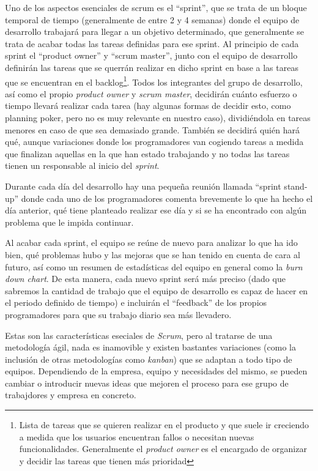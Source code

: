 Uno de los aspectos esenciales de scrum es el ``sprint'', que se trata de un bloque temporal de tiempo (generalmente de entre 2 y 4 semanas) donde el equipo de desarrollo trabajará para llegar a un objetivo determinado, que generalmente se trata de acabar todas las tareas definidas para ese sprint. 
Al principio de cada sprint  el ``product owner'' y ``scrum master'', junto con el equipo de desarrollo definirán las tareas que se querrán realizar en dicho sprint en base a las tareas que se encuentran en el backlog\footnote{Lista de tareas que se quieren realizar en el producto y que suele ir creciendo a medida que los usuarios encuentran fallos o necesitan nuevas funcionalidades. Generalmente el \textit{product owner} es el encargado de organizar y decidir las tareas que tienen más prioridad}. Todos los integrantes del grupo de desarrollo, así como el propio \textit{product owner} y \textit{scrum master}, decidirán cuánto esfuerzo o tiempo llevará realizar cada tarea (hay algunas formas de decidir esto, como planning poker, pero no es muy relevante en nuestro caso), dividiéndola en tareas menores en caso de que sea demasiado grande. También se decidirá quién hará qué, aunque variaciones donde los programadores van cogiendo tareas a medida que finalizan aquellas en la que han estado trabajando y no todas las tareas tienen un responsable al inicio del \textit{sprint}.

Durante cada día del desarrollo hay una pequeña reunión llamada ``sprint stand-up'' donde cada uno de los programadores comenta brevemente lo que ha hecho el día anterior, qué tiene planteado realizar ese día y si se ha encontrado con algún problema que le impida continuar.

Al acabar cada sprint, el equipo se reúne de nuevo para analizar lo que ha ido bien, qué problemas hubo y las mejoras que se han tenido en cuenta de cara al futuro, así como un resumen de estadísticas del equipo en general como la \textit{burn down chart}. De esta manera, cada nuevo sprint será más preciso (dado que sabremos la cantidad de trabajo que el equipo de desarrollo es capaz de hacer en el periodo definido de tiempo) e incluirán el ``feedback'' de los propios programadores para que su trabajo diario sea más llevadero.

Estas son las características eseciales de \textit{Scrum}, pero al tratarse de una metodología ágil, nada es inamovible y existen bastantes variaciones (como la inclusión de otras metodologías como \textit{kanban}) que se adaptan a todo tipo de equipos. Dependiendo de la empresa, equipo y necesidades del mismo, se pueden cambiar o introducir nuevas ideas que mejoren el proceso para ese grupo de trabajdores y empresa en concreto.

